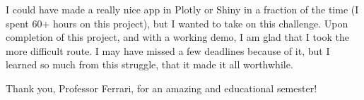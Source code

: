 \documentclass[]{article}
\begin{document}
I could have made a really nice app in Plotly or Shiny in a fraction of
the time (I spent 60+ hours on this project), but I wanted to take on
this challenge. Upon completion of this project, and with a working
demo, I am glad that I took the more difficult route. I may have missed
a few deadlines because of it, but I learned so much from this struggle,
that it made it all worthwhile.

Thank you, Professor Ferrari, for an amazing and educational semester!
\end{document}
